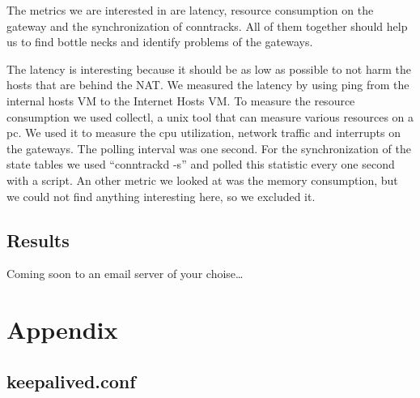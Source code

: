 \documentclass{report}
\begin{document}
The metrics we are interested in are latency, resource consumption on
the gateway and the synchronization of conntracks. All of them together
should help us to find bottle necks and identify problems of the
gateways.

The latency is interesting because it should be as low as possible to
not harm the hosts that are behind the NAT. We measured the latency by
using ping\cite{ping} from the internal hosts VM to the Internet Hosts VM.
To measure the resource consumption we used collectl\cite{collectl}, a unix tool that
can measure various resources on a pc. We used it to measure the cpu
utilization, network traffic and interrupts on the gateways. The polling
interval was one second. For the synchronization of the state tables we
used ``conntrackd -s'' and polled this statistic every one second with a
script. An other metric we looked at was the memory consumption, but we
could not find anything interesting here, so we excluded it.

\section{Results}\label{results}

Coming soon to an email server of your choise\ldots{}

\chapter{Appendix}\label{appendix}

\section{keepalived.conf}\label{keepalived-1}
\end{document}
